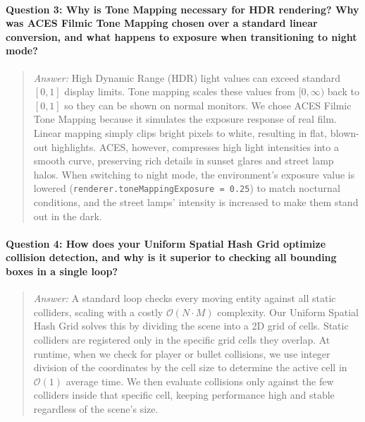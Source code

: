 \documentclass[11pt,a4paper,oneside]{article}
\begin{document}
\paragraph{Question 3: Why is Tone Mapping necessary for HDR rendering? Why was ACES Filmic Tone Mapping chosen over a standard linear conversion, and what happens to exposure when transitioning to night mode?}
\begin{quote}
    \emph{Answer:} High Dynamic Range (HDR) light values can exceed standard $[0, 1]$ display limits. Tone mapping scales these values from $[0, \infty)$ back to $[0, 1]$ so they can be shown on normal monitors.
    We chose ACES Filmic Tone Mapping because it simulates the exposure response of real film. Linear mapping simply clips bright pixels to white, resulting in flat, blown-out highlights. ACES, however, compresses high light intensities into a smooth curve, preserving rich details in sunset glares and street lamp halos.
    When switching to night mode, the environment's exposure value is lowered (\texttt{renderer.toneMappingExposure = 0.25}) to match nocturnal conditions, and the street lamps' intensity is increased to make them stand out in the dark.
\end{quote}

\paragraph{Question 4: How does your Uniform Spatial Hash Grid optimize collision detection, and why is it superior to checking all bounding boxes in a single loop?}
\begin{quote}
    \emph{Answer:} A standard loop checks every moving entity against all static colliders, scaling with a costly $\mathcal{O}(N \cdot M)$ complexity. 
    Our Uniform Spatial Hash Grid solves this by dividing the scene into a 2D grid of cells. Static colliders are registered only in the specific grid cells they overlap. At runtime, when we check for player or bullet collisions, we use integer division of the coordinates by the cell size to determine the active cell in $\mathcal{O}(1)$ average time.
    We then evaluate collisions only against the few colliders inside that specific cell, keeping performance high and stable regardless of the scene's size.
\end{quote}
\end{document}
